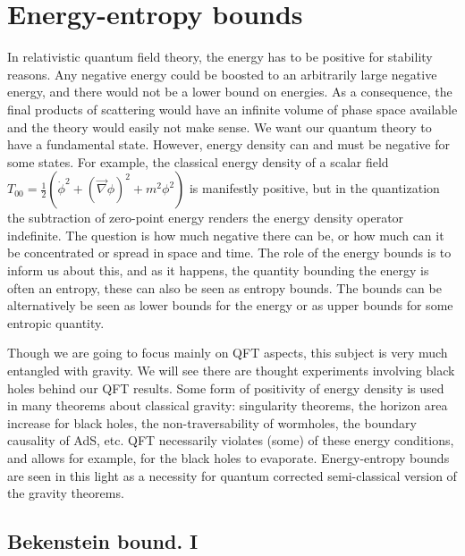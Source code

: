 \documentclass[11pt]{article}
\numberwithin{equation}{section}
\begin{document}
\section{Energy-entropy  bounds}
 In relativistic quantum field theory, the energy has to be positive for stability reasons. Any negative energy could be boosted to an arbitrarily large negative energy, and there would not be a lower bound on energies. As a consequence, the final products of scattering would have an infinite volume of phase space available and the theory would easily not make sense. We want our quantum theory to have a fundamental state. However, energy density can and must be negative for some states. For example, the classical energy density of a scalar field $T_{00}=\frac{1}{2}(\dot{\phi}^2+(\vec{\nabla} \phi)^2+m^2\phi^2)$ is manifestly positive, but in the quantization the subtraction of zero-point energy renders the energy density operator indefinite. 
  The question is how much negative there can be, or how much can it be concentrated or spread in space and time. The role of the energy bounds is to inform us about this, and as it happens, the quantity bounding the energy is often an entropy, these can also be seen as entropy bounds. The bounds can be alternatively be seen as lower bounds for the energy or as upper bounds for some entropic quantity. 
   
Though we are going to focus mainly on QFT aspects, this subject is very much entangled with gravity. We will see there are thought experiments involving black holes behind our QFT results. Some form of positivity of energy density is used in many theorems about classical gravity: singularity theorems, the horizon area increase for black holes, the non-traversability of wormholes, the boundary causality of AdS, etc. 
 QFT necessarily violates (some) of these energy conditions, and allows for example, for the black holes to evaporate. Energy-entropy bounds are seen in this light as a necessity for quantum corrected semi-classical version of the gravity theorems. 
 
   

\subsection{Bekenstein bound. I}
\end{document}
